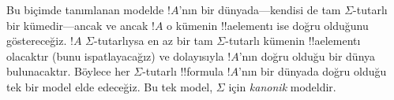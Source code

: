 \documentclass[../../../include/open-logic-section]{subfiles}
\begin{document}
Bu biçimde tanımlanan modelde $!A$'nın bir dünyada---kendisi de tam
$\Sigma$-tutarlı bir kümedir---ancak ve ancak $!A$ o kümenin !!a{element}{}ı
ise doğru olduğunu göstereceğiz. $!A$ $\Sigma$-tutarlıysa en az bir tam
$\Sigma$-tutarlı kümenin !!a{element}{}ı olacaktır (bunu ispatlayacağız) ve
dolayısıyla $!A$'nın doğru olduğu bir dünya bulunacaktır. Böylece her
$\Sigma$-tutarlı !!{formula} $!A$'nın bir dünyada doğru olduğu tek bir
model elde edeceğiz. Bu tek model, $\Sigma$ için \emph{kanonik} modeldir.
\end{document}
